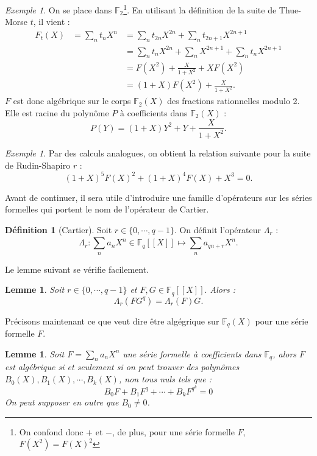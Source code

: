 \documentclass[12pt]{article}
\theoremstyle{plain}
\newtheorem{lemme}[theoreme]{Lemme}
\theoremstyle{definition}
\newtheorem{definition}[theoreme]{D\'efinition}
\theoremstyle{remark}
\newtheorem{exemple}[theoreme]{Exemple}
\begin{document}
\begin{exemple}
  On se place dans $\mathbb{F}_{2}$\footnote{On confond donc $+$ et $-$, de plus, pour une s\'erie
  formelle $F$, $F(X^{2})=F(X)^{2}$}. En utilisant la d\'efinition de la suite de Thue-Morse $t$, il
  vient : 
  \begin{displaymath}
  \begin{array}{lll}
  F_{t}(X)&=\sum_{n}t_{n}X^{n}&=\sum_{n}t_{2n}X^{2n}+\sum_{n}t_{2n+1}X^{2n+1}\\&&=\sum_{n}t_{n}
  X^{2n}+\sum_{n}X^{2n+1}+\sum_{n}t_{n}X^{2n+1}\\&&=F(X^{2})+\frac{X}{1+X^{2}}+XF(X^{2})\\&&=(1+X)F(X^{2})+
  \frac{X}{1+X^{2}}.
  \end{array}
  \end{displaymath}
  $F$ est donc alg\'ebrique sur le corps $\mathbb{F}_{2}(X)$ des fractions rationnelles modulo 2.
  Elle est racine du polyn\^ome $P$ \`a coefficients dans $\mathbb{F}_{2}(X)$ : $$P(Y)=(1+X)Y^{2}+Y+
  \frac{X}{1+X^{2}}.$$
\end{exemple}

\begin{exemple}
  Par des calculs analogues, on obtient la relation suivante pour la suite de Rudin-Shapiro $r$ : $$(1+X)^
  {5}F(X)^{2}+(1+X)^{4}F(X)+X^{3}=0.$$
\end{exemple}

Avant de continuer, il sera utile d'introduire une famille d'op\'erateurs sur les s\'eries formelles qui portent le nom de l'op\'erateur de Cartier.

\begin{definition}[Cartier]
  Soit $r\in\{0,\cdots,q-1\}.$ On d\'efinit l'op\'erateur $\Lambda_{r}$ : $$\Lambda_{r}:\sum_{n}^{ }a_{n}X^
  {n}\in\mathbb{F}_{q}[[X]]\mapsto\sum_{n}a_{qn+r}X^{n}.$$
\end{definition}

Le lemme suivant se v\'erifie facilement.

\begin{lemme}
  Soit $r\in\{0,\cdots,q-1\}$ et $F,G\in\mathbb{F}_{q}[[X]].$ Alors : $$\Lambda_{r}(FG^{q})=\Lambda_{r}(F)G
  .$$
\end{lemme}

Pr\'ecisons maintenant ce que veut dire \^etre alg\'egrique sur $\mathbb{F}_{q}(X)$ pour une s\'erie formelle $F$.

\begin{lemme}\label{liaison}
  Soit $F=\sum_{n}a_{n}X^{n}$ une s\'erie formelle \`a coefficients dans $\mathbb{F}_{q}$, alors $F$ est
  alg\'ebrique si et seulement si on peut trouver des polyn\^omes $B_{0}(X),B_{1}(X),\cdots,B_{k}(X)$, non
  tous nuls tels que : $$B_{0}F+B_{1}F^{q}+\cdots+B_{k}F^{q^{k}}=0$$ 
  On peut supposer en outre que $B_{0}\neq 0$.
\end{lemme}
\end{document}
